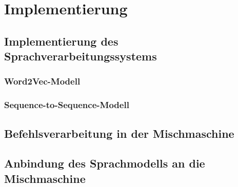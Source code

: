 \chapter{Implementierung}
\section{Implementierung des Sprachverarbeitungssystems}
\subsection{Word2Vec-Modell}
\subsection{Sequence-to-Sequence-Modell}
\section{Befehlsverarbeitung in der Mischmaschine}
\section{Anbindung des Sprachmodells an die Mischmaschine}
\endinput


